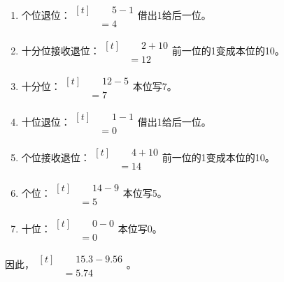 {\begin{enumerate}[leftmargin=1.7em,itemsep=5pt,topsep=0pt]
\item 个位退位：\(\begin{aligned}[t]&\phantom{={}}5-1\\&=4\end{aligned}\)\quad 借出1给后一位。
\item 十分位接收退位：\(\begin{aligned}[t]&\phantom{={}}2+10\\&=12\end{aligned}\)\quad 前一位的1变成本位的10。
\item 十分位：\(\begin{aligned}[t]&\phantom{={}}12-5\\&=7\end{aligned}\)\quad 本位写7。
\item 十位退位：\(\begin{aligned}[t]&\phantom{={}}1-1\\&=0\end{aligned}\)\quad 借出1给后一位。
\item 个位接收退位：\(\begin{aligned}[t]&\phantom{={}}4+10\\&=14\end{aligned}\)\quad 前一位的1变成本位的10。
\item 个位：\(\begin{aligned}[t]&\phantom{={}}14-9\\&=5\end{aligned}\)\quad 本位写5。
\item 十位：\(\begin{aligned}[t]&\phantom{={}}0-0\\&=0\end{aligned}\)\quad 本位写0。
\end{enumerate}
\par\smallskip
因此，\(\begin{aligned}[t]&\phantom{={}}15.3-9.56\\&=5.74\end{aligned}\)。
\par\medskip

}


\par



